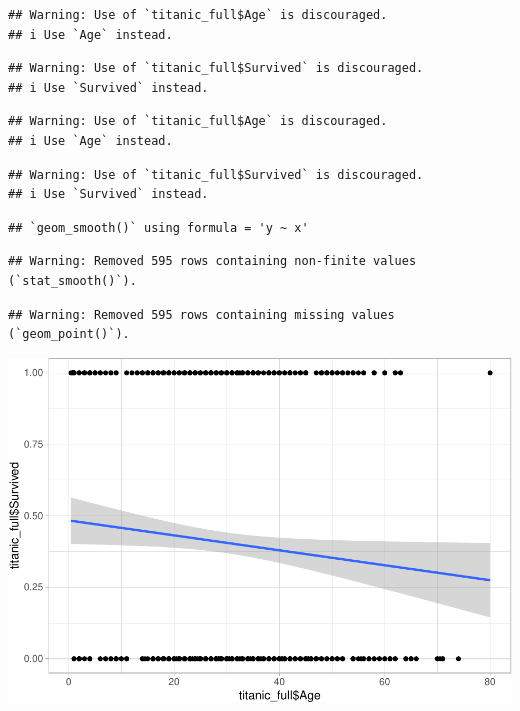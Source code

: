 \documentclass[
]{article}
\newenvironment{Shaded}{\begin{snugshade}}{\end{snugshade}}
\newcommand{\AttributeTok}[1]{\textcolor[rgb]{0.77,0.63,0.00}{#1}}
\newcommand{\ConstantTok}[1]{\textcolor[rgb]{0.00,0.00,0.00}{#1}}
\newcommand{\FunctionTok}[1]{\textcolor[rgb]{0.00,0.00,0.00}{#1}}
\newcommand{\NormalTok}[1]{#1}
\newcommand{\SpecialCharTok}[1]{\textcolor[rgb]{0.00,0.00,0.00}{#1}}
\begin{document}
\begin{Shaded}
\end{Shaded}

\begin{verbatim}
## Warning: Use of `titanic_full$Age` is discouraged.
## i Use `Age` instead.
\end{verbatim}

\begin{verbatim}
## Warning: Use of `titanic_full$Survived` is discouraged.
## i Use `Survived` instead.
\end{verbatim}

\begin{verbatim}
## Warning: Use of `titanic_full$Age` is discouraged.
## i Use `Age` instead.
\end{verbatim}

\begin{verbatim}
## Warning: Use of `titanic_full$Survived` is discouraged.
## i Use `Survived` instead.
\end{verbatim}

\begin{verbatim}
## `geom_smooth()` using formula = 'y ~ x'
\end{verbatim}

\begin{verbatim}
## Warning: Removed 595 rows containing non-finite values (`stat_smooth()`).
\end{verbatim}

\begin{verbatim}
## Warning: Removed 595 rows containing missing values (`geom_point()`).
\end{verbatim}

\includegraphics{final_pdf_files/figure-latex/unnamed-chunk-12-1.pdf}
\end{document}
